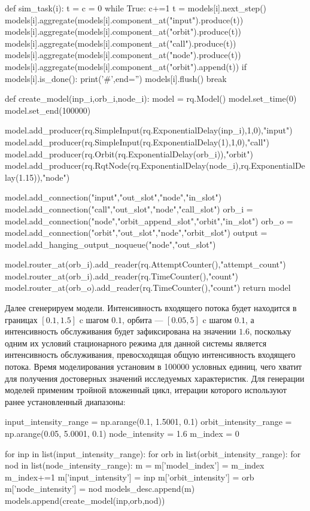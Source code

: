 \begin{pyin} 
def sim_task(i):
   t = c = 0
   while True:
      c+=1 
      t = models[i].next_step()
      models[i].aggregate(models[i].component_at("input").produce(t))
      models[i].aggregate(models[i].component_at("orbit").produce(t))
      models[i].aggregate(models[i].component_at("call").produce(t))
      models[i].aggregate(models[i].component_at("node").produce(t))
      models[i].aggregate(models[i].component_at("orbit").append(t))
      if models[i].is_done():
         print('#',end='')
         models[i].flush()
         break
\end{pyin}         

\begin{pyin}
def create_model(inp_i,orb_i,node_i):
model = rq.Model()
model.set_time(0) 
model.set_end(100000)

model.add_producer(rq.SimpleInput(rq.ExponentialDelay(inp_i),1,0),"input")
model.add_producer(rq.SimpleInput(rq.ExponentialDelay(1),1,0),"call")
model.add_producer(rq.Orbit(rq.ExponentialDelay(orb_i)),"orbit")
model.add_producer(rq.RqtNode(rq.ExponentialDelay(node_i),rq.ExponentialDelay(1.15)),"node")

model.add_connection("input","out_slot","node","in_slot")
model.add_connection("call","out_slot","node","call_slot")
orb_i = model.add_connection("node","orbit_append_slot","orbit","in_slot")
orb_o = model.add_connection("orbit","out_slot","node","orbit_slot")
output = model.add_hanging_output_noqueue("node","out_slot")

model.router_at(orb_i).add_reader(rq.AttemptCounter(),"attempt_count")
model.router_at(orb_i).add_reader(rq.TimeCounter(),"count")
model.router_at(orb_o).add_reader(rq.TimeCounter(),"count")
return model
\end{pyin}


Далее сгенерируем модели. Интенсивность входящего потока будет находится в границах $[0.1,1.5]$ c шагом $0.1$, орбита --- $[0.05,5]$ c шагом $0.1$, а интенсивность обслуживания будет зафиксирована на значении $1.6$, поскольку одним их условий стационарного режима для данной системы является интенсивность обслуживания, превосходящая общую интенсивность входящего потока. Время моделирования установим в 100000 условных единиц, чего хватит для получения достоверных значений исследуемых характеристик. Для генерации моделей применим тройной вложенный цикл, итерации которого используют ранее установленный диапазоны:
\begin{pyin} 
input_intensity_range = np.arange(0.1, 1.5001, 0.1)
orbit_intensity_range = np.arange(0.05, 5.0001, 0.1)
node_intensity = 1.6
m_index = 0

for inp in list(input_intensity_range):
for orb in list(orbit_intensity_range):
for nod in list(node_intensity_range):
   m = {}
   m['model_index'] = m_index
   m_index+=1
   m['input_intensity'] = inp
   m['orbit_intensity'] = orb
   m['node_intensity'] = nod
   models_desc.append(m)
   models.append(create_model(inp,orb,nod))
\end{pyin}

